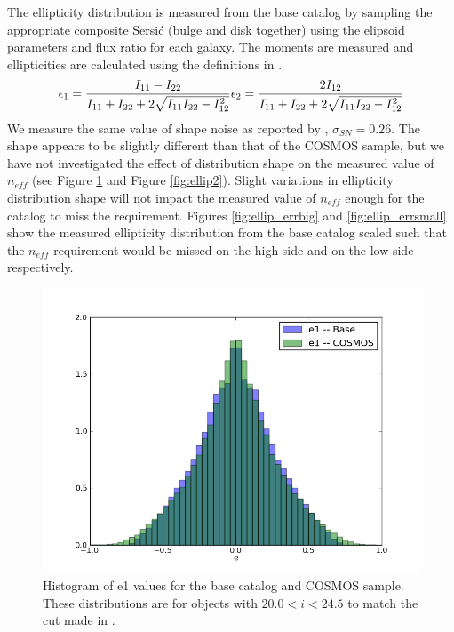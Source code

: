 \documentclass[]{article}
\begin{document}
{The ellipticity distribution is measured from the base catalog by sampling the appropriate composite Sersi{\'c} (bulge and disk together) using the
elipsoid parameters and flux ratio for each galaxy.  The moments are measured and ellipticities are calculated using the definitions in \citet{chang}.
\begin{equation}
\epsilon_1 = \frac{I_{11}-I_{22}}{I_{11}+I_{22}+2\sqrt{I_{11}I_{22} - I^{2}_{12}}}\\
\epsilon_2 = \frac{2I_{12}}{I_{11}+I_{22}+2\sqrt{I_{11}I_{22} - I^{2}_{12}}}
\end{equation}
We measure the same value of shape noise as reported by \citet{chang}, $\sigma_{SN} = 0.26$.  The shape appears to be slightly different than
that of the COSMOS sample, but we have not investigated the effect of distribution shape on the measured value of $n_{eff}$ (see Figure \ref{fig:ellip1} 
and Figure \ref{fig:ellip2}).  
Slight variations in
ellipticity distribution shape will not impact the measured value of $n_{eff}$ enough for the catalog to miss the requirement.  Figures \ref{fig:ellip_errbig}
and \ref{fig:ellip_errsmall} show the measured ellipticity distribution from the base catalog scaled such that the $n_{eff}$ requirement would be missed on the high side 
and on the low side respectively.
\begin{figure}[H]
\centering
\includegraphics[width=5in]{validation_figures/e1_hist.png}
\caption{Histogram of e1 values for the base catalog and COSMOS sample.  These distributions are for objects with $20.0 < i < 24.5$ to match
the cut made in \citet{chang}.\label{fig:ellip1}}
\end{figure}
\begin{figure}[H]

\end{figure}}
\end{document}
